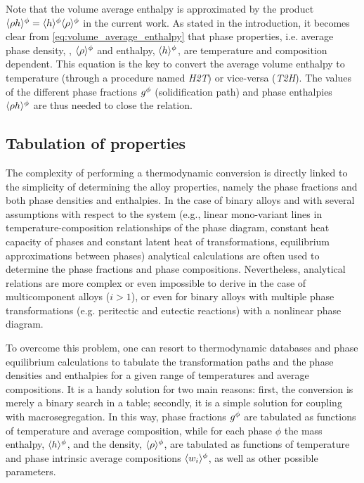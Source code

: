 Note that the volume average enthalpy is approximated by the product $\langle \rho h \rangle^{\phi}=\langle h \rangle^{\phi}  \langle \rho \rangle^{\phi} $ in the current work. As stated 
in the introduction, it becomes clear from \cref{eq:volume_average_enthalpy} that phase properties, i.e. average phase density, , $\langle \rho \rangle^{\phi} $ and enthalpy, $\langle h \rangle^{\phi} $, 
are temperature and composition dependent. This equation is the key to convert the average volume enthalpy to temperature (through a procedure named \emph{H2T}) 
or vice-versa (\emph{T2H}). The values of the different phase fractions ${g^{\phi}} $ (solidification path) and phase enthalpies $\langle  \rho h  \rangle^{\phi}$ are thus needed 
to close the relation.

\subsection{Tabulation of properties}

The complexity of performing a thermodynamic conversion is directly linked 
to the simplicity of determining the alloy properties, namely the phase fractions 
and both phase densities and enthalpies. In the case of binary alloys and with several assumptions 
with respect to the system (e.g., linear mono-variant lines in temperature-composition 
relationships of the phase diagram, constant heat capacity of phases and constant latent heat of transformations, 
equilibrium approximations between phases) analytical calculations are often used to determine 
the phase fractions and phase compositions. 
Nevertheless, analytical relations are more complex or even impossible to derive 
in the case of multicomponent alloys ($i>1$), or even for binary alloys with multiple phase transformations
(e.g. peritectic and eutectic reactions) with a nonlinear phase diagram. 

To overcome this problem, one can resort to 
thermodynamic databases and phase equilibrium calculations to tabulate the transformation paths 
and the phase densities and enthalpies for a given range of temperatures and average compositions. It is a handy 
solution for two main reasons: first, the conversion is merely a binary search in a table; secondly, 
it is a simple solution for coupling with macrosegregation. In this way, phase fractions ${g^{\phi}} $ are 
tabulated as functions of temperature and average composition, while for each phase $\phi$ the mass 
enthalpy, $\langle h \rangle^{\phi} $, and the density, $\langle \rho \rangle^{\phi} $, are tabulated as functions of temperature and phase 
intrinsic average compositions $\langle w_i \rangle^\phi$, as well as other possible parameters. 

